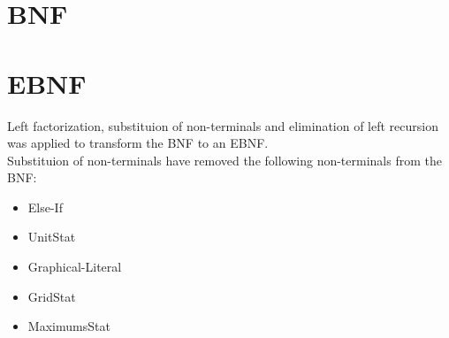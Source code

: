 \appendix
\chapter{BNF}

\appendix
\chapter{EBNF}
	Left factorization, substituion of non-terminals 
	and elimination of left recursion was applied to transform the BNF to an EBNF. \\

	Substituion of non-terminals have removed the following non-terminals from the BNF: \\
	\begin{itemize}
		\item Else-If
		\item UnitStat
		\item Graphical-Literal
		\item GridStat
		\item MaximumsStat
	\end{itemize}
	
